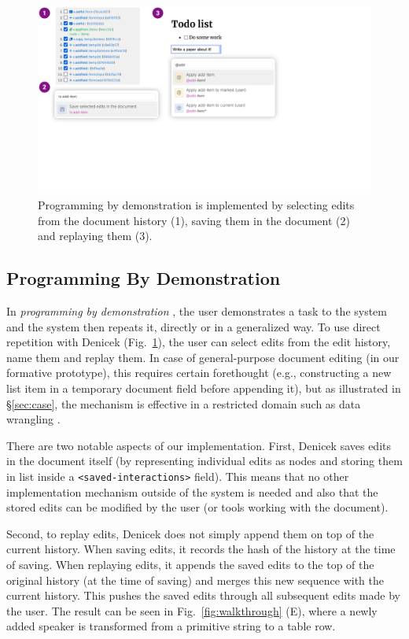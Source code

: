 \documentclass[sigconf,anonymous,screen]{acmart}
\begin{document}
\begin{figure}[t]
\includegraphics[width=0.9\columnwidth,clip,trim=0cm 7cm 9cm 0cm]{fig/pbd.pdf}
\vspace{-0.5em}
\caption{Programming by demonstration is implemented by selecting edits from the document
history (1), saving them in the document (2) and replaying them (3).}
\label{fig:pbd}
\vspace{-0.5em}
\end{figure}

\subsection{Programming By Demonstration}
\label{sec:impl-pbd}

In \emph{programming by demonstration} \cite{cypher-1993-pbd}, the user demonstrates a task to the
system and the system then repeats it, directly or in a generalized way. To use direct
repetition with Denicek (Fig.~\ref{fig:pbd}), the user can select edits from the edit history,
name them and replay them. In case of general-purpose document editing (in our formative prototype),
this requires certain forethought (e.g., constructing a new list item in a temporary document
field before appending it), but as illustrated in \S\ref{sec:case}, the mechanism is effective in
a restricted domain such as data wrangling \cite{kandel-2011-wrangler}.

There are two notable aspects of our implementation. First, Deni\-cek saves edits in the document
itself (by representing individual edits as nodes and storing them in list inside a
{\small\Verb_<saved-interactions>_} field). This means that no other implementation mechanism
outside of the system is needed and also that the stored edits can be modified by the user
(or tools working with the document).

Second, to replay edits, Denicek does not simply append them on top of the current history.
When saving edits, it records the hash of the history at the time of saving. When replaying edits,
it appends the saved edits to the top of the original history (at the time of saving) and merges this new
sequence with the current history. This pushes the saved edits through all subsequent edits made
by the user. The result can be seen in Fig.~\ref{fig:walkthrough} (E), where a newly added speaker
is transformed from a primitive string to a table row.
\end{document}
